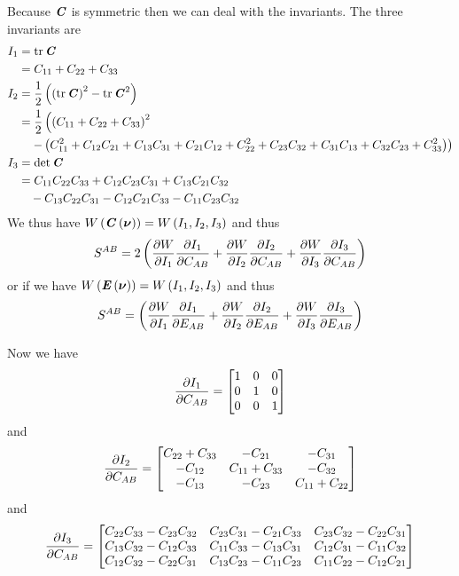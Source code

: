 Because $\boldsymbol{\mathit{C}}$ is symmetric then we can deal with the invariants. The
three invariants are
\begin{equation}
  \begin{split}
    I_{1} &= \operatorname{tr}\boldsymbol{\mathit{C}} \\
    &= C_{11} + C_{22} + C_{33} \\
    I_{2} &=
    \dfrac{1}{2}\left( \left( \operatorname{tr}\boldsymbol{\mathit{C}} \right)^{2}-\operatorname{tr}\boldsymbol{\mathit{C}}^{2} \right) \\
    &=
    \dfrac{1}{2}\left(\left( C_{11}+C_{22}+C_{33} \right)^{2}\right. \\
      & \quad\left.-\left( C_{11}^{2}+C_{12}C_{21}+C_{13}C_{31}+
        C_{21}C_{12}+C_{22}^{2}+C_{23}C_{32}+C_{31}C_{13}+C_{32}C_{23}+C_{33}^{2} \right)\right) \\
    I_{3} &= \det{\ensuremath{\boldsymbol{\mathit{C}}}} \\
    &=C_{11}C_{22}C_{33}+C_{12}C_{23}C_{31}+C_{13}C_{21}C_{32}\\
    &\quad-C_{13}C_{22}C_{31}-C_{12}C_{21}C_{33}-C_{11}C_{23}C_{32}
  \end{split}
\end{equation}
We thus have
$ W\left(  \boldsymbol{\mathit{C}}\left( \boldsymbol{\nu} \right)  \right) = W\left( I_{1},I_{2},I_{3} \right) $ and
thus
\begin{equation}
  S^{AB}=2\left(  \dfrac{\partial W}{\partial I_{1}}  \dfrac{\partial I_{1}}{\partial C_{AB}} + \dfrac{\partial W}{\partial I_{2}}  \dfrac{\partial I_{2}}{\partial C_{AB}} + \dfrac{\partial W}{\partial I_{3}}  \dfrac{\partial I_{3}}{\partial C_{AB}}  \right)
\end{equation}
or if we have
$ W\left(  \boldsymbol{\mathit{E}}\left( \boldsymbol{\nu} \right)  \right) = W\left( I_{1},I_{2},I_{3} \right) $ and
thus
\begin{equation}
  S^{AB}=\left(  \dfrac{\partial W}{\partial I_{1}}  \dfrac{\partial I_{1}}{\partial E_{AB}} + \dfrac{\partial W}{\partial I_{2}}  \dfrac{\partial I_{2}}{\partial E_{AB}} + \dfrac{\partial W}{\partial I_{3}}  \dfrac{\partial I_{3}}{\partial E_{AB}}  \right)
\end{equation}

Now we have
\begin{equation}
   \dfrac{\partial I_{1}}{\partial C_{AB}} =\begin{bmatrix}
    1 & 0 & 0 \\
    0 & 1 & 0 \\
    0 & 0 & 1
  \end{bmatrix}
\end{equation}
and
\begin{equation}
   \dfrac{\partial I_{2}}{\partial C_{AB}} =\begin{bmatrix}
    C_{22}+C_{33} & -C_{21} & -C_{31} \\
    -C_{12} & C_{11}+C_{33} & -C_{32} \\
    -C_{13} & -C_{23} & C_{11}+C_{22}
  \end{bmatrix}
\end{equation}
and
\begin{equation}
   \dfrac{\partial I_{3}}{\partial C_{AB}} =\begin{bmatrix}
    C_{22}C_{33}-C_{23}C_{32} & C_{23}C_{31}-C_{21}C_{33} & C_{23}C_{32}-C_{22}C_{31} \\
    C_{13}C_{32}-C_{12}C_{33} & C_{11}C_{33}-C_{13}C_{31} & C_{12}C_{31}-C_{11}C_{32} \\
    C_{12}C_{32}-C_{22}C_{31} & C_{13}C_{23}-C_{11}C_{23} & C_{11}C_{22}-C_{12}C_{21}
  \end{bmatrix}
\end{equation}

